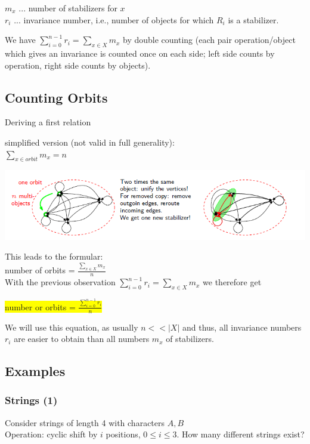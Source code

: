 \documentclass[12pt,onecolumn%
]{scrartcl}
\begin{document}
$m_{x}$ ... number of stabilizers for $x$ \\
$r_{i}$ ... invariance number, i.e., number of objects for which
$R_{i}$ is a stabilizer.

We have $\sum \limits_{i = 0}^{n - 1} r_{i} = \sum \limits_{x \in X} m_{x}$
by double counting (each pair operation/object which gives
an invariance is counted once on each side; left side counts
by operation, right side counts by objects).

\subsection{Counting Orbits}
Deriving a first relation { simplified version (not valid in full
generality):\\
$ \sum \limits_{x \in orbit} m_{x} = n $
\begin{flushleft}
\includegraphics[scale=0.8]{img/orbits}
\end{flushleft}
This leads to the formular: \\
number of orbits = $\frac{\sum \limits_{x \in X} m_{x}}{n}$ \\
With the previous observation $\sum \limits_{i = 0}^{n - 1} r_{i} = \sum \limits_{x \in X} m_{x}$
we therefore get
\begin{center}
\colorbox{yellow}{number or orbits = $\frac{\sum \limits_{i = 0}^{n - 1} r_{i}}{n}$}
\end{center}
We will use this equation, as usually $n << |X|$ and thus,
all invariance numbers $r_{i}$ are easier to obtain than all
numbers $m_{x}$ of stabilizers.

\subsection{Examples}
\subsubsection{Strings (1)}
Consider strings of length 4 with characters ${A,B}$\\
Operation: cyclic shift by $i$ positions, $0 \leq i \leq 3$. How many
different strings exist?

}
\end{document}
